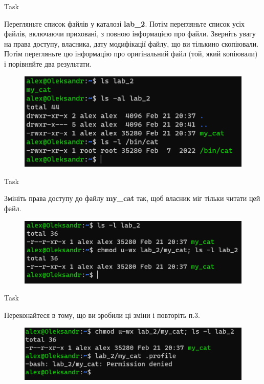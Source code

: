 \documentclass[a4paper,12pt]{article}
\newcommand{\RomanNumeralCaps}[1]{\MakeUppercase{\romannumeral #1}}
\begin{document}
\newpage
    \begin{center}
        \Large{Task \RomanNumeralCaps{4}}
    \end{center}
    Перегляньте список файлів у каталозі \textbf{lab\_2}. Потім перегляньте список усіх файлів, включаючи приховані, з
    повною інформацією про файли. Зверніть увагу на права доступу, власника, дату модифікації файлу, що ви тількино скопіювали. 
    Потім перегляньте цю інформацію про оригінальний файл (той, який копіювали) і порівняйте два результати.
    \begin{figure}[h!]
        \begin{minipage}[h]{1\linewidth}
            \centering
            \includegraphics[width=0.6\linewidth]{Prt sc/Figure_4.png}  
        \end{minipage}
    \end{figure}

    \begin{center}
        \Large{Task \RomanNumeralCaps{5}}
    \end{center}
    Змініть права доступу до файлу \textbf{my\_cat} так, щоб власник міг тільки читати цей файл.
    \begin{figure}[h!]
        \begin{minipage}[h]{1\linewidth}
            \centering
            \includegraphics[width=0.6\linewidth]{Prt sc/Figure_5.png}  
        \end{minipage}
    \end{figure}

    \begin{center}
        \Large{Task \RomanNumeralCaps{6}}
    \end{center}
    Переконайтеся в тому, що ви зробили ці зміни і повторіть п.3.
    \begin{figure}[h!]
        \begin{minipage}[h]{1\linewidth}
            \centering
            \includegraphics[width=0.6\linewidth]{Prt sc/Figure_6.png}  
        \end{minipage}
    \end{figure}
\end{document}
